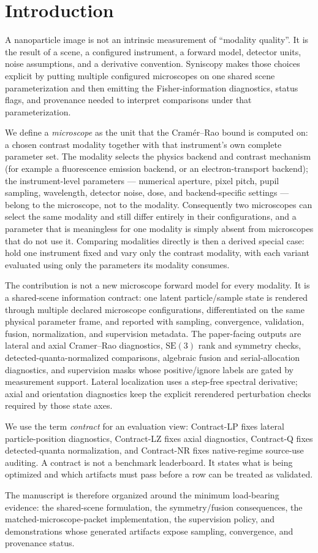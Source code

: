 \section{Introduction}

A nanoparticle image is not an intrinsic measurement of ``modality quality''. It is the result of a scene, a configured instrument, a forward model, detector units, noise assumptions, and a derivative convention. Syniscopy makes those choices explicit by putting multiple configured microscopes on one shared scene parameterization and then emitting the Fisher-information diagnostics, status flags, and provenance needed to interpret comparisons under that parameterization.

We define a \emph{microscope} as the unit that the Cram\'{e}r--Rao bound is computed on: a chosen contrast modality together with that instrument's own complete parameter set. The modality selects the physics backend and contrast mechanism (for example a fluorescence emission backend, or an electron-transport backend); the instrument-level parameters --- numerical aperture, pixel pitch, pupil sampling, wavelength, detector noise, dose, and backend-specific settings --- belong to the microscope, not to the modality. Consequently two microscopes can select the same modality and still differ entirely in their configurations, and a parameter that is meaningless for one modality is simply absent from microscopes that do not use it. Comparing modalities directly is then a derived special case: hold one instrument fixed and vary only the contrast modality, with each variant evaluated using only the parameters its modality consumes.

The contribution is not a new microscope forward model for every modality. It is a shared-scene information contract: one latent particle/sample state is rendered through multiple declared microscope configurations, differentiated on the same physical parameter frame, and reported with sampling, convergence, validation, fusion, normalization, and supervision metadata. The paper-facing outputs are lateral and axial Cramer--Rao diagnostics, \(\mathrm{SE}(3)\) rank and symmetry checks, detected-quanta-normalized comparisons, algebraic fusion and serial-allocation diagnostics, and supervision masks whose positive/ignore labels are gated by measurement support. Lateral localization uses a step-free spectral derivative; axial and orientation diagnostics keep the explicit rerendered perturbation checks required by those state axes.

We use the term \emph{contract} for an evaluation view: Contract-LP fixes lateral particle-position diagnostics, Contract-LZ fixes axial diagnostics, Contract-Q fixes detected-quanta normalization, and Contract-NR fixes native-regime source-use auditing. A contract is not a benchmark leaderboard. It states what is being optimized and which artifacts must pass before a row can be treated as validated.

The manuscript is therefore organized around the minimum load-bearing evidence: the shared-scene formulation, the symmetry/fusion consequences, the matched-microscope-packet implementation, the supervision policy, and demonstrations whose generated artifacts expose sampling, convergence, and provenance status.
